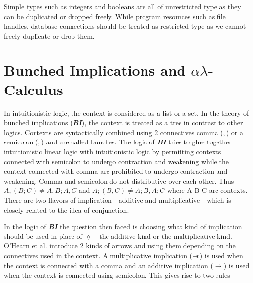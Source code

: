Simple types such as integers and booleans are all of unrestricted type as
they can be duplicated or dropped freely.
While program resources such as file handles, database connections
should be treated as restricted type as we cannot freely duplicate
or drop them. %

\section{Bunched Implications and $\alpha\lambda$-Calculus}

In intuitionistic logic, the context is considered as a list or a set. In the theory of
bunched implications (\textbf{\em BI}), the context is treated as a tree in contrast to other logics. Contexts are syntactically
combined using 2 connectives comma ($,$) or a semicolon ($;$) and are called bunches. The logic of \textbf{\em BI}
tries to glue together intuitionistic linear logic with intuitionistic logic by
permitting contexts connected with semicolon to undergo contraction and weakening while the context connected with comma
are prohibited to undergo contraction and weakening. Comma and semicolon do not distributive over each other.
Thus $A,(B;C) \neq A, B ; A,C$ and $A;(B,C) \neq A;B,A;C$ where A B C are contexts.
There are two flavors of implication---additive and multiplicative---which is closely related to the idea of conjunction.
\begin{framed}\centering
\begin{minipage}{1.0\linewidth}
  \begin{prooftree}
  \end{prooftree}
\end{minipage}
\end{framed}
In the logic of {\textbf{\em BI}} the question then faced is choosing what kind of
implication should be used in place of $\lozenge$---the additive kind or the multiplicative kind.
O'Hearn et al. \citeyearpar{ohearn_logic_1999} introduce 2 kinds of arrows
and using them depending on the connectives used in the context. A multiplicative implication ($\sepimp$)
is used when the context is connected with a comma and an additive implication ($\rightarrow$) is used when the
context is connected using semicolon. This gives rise to two rules
